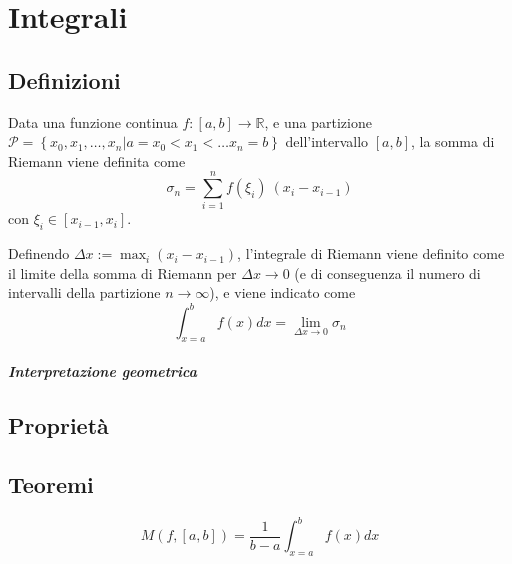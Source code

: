 \chapter{Integrali}

\section{Definizioni}
\begin{definition} Data una funzione continua $f:[a,b] \rightarrow \mathbb{R}$, e una partizione $\mathcal{P} = \left\{x_0, x_1, \dots, x_n | a = x_0 < x_1 < \dots x_n = b \right\}$ dell'intervallo $[a,b]$, la somma di Riemann viene definita come
    \begin{equation}
        \sigma_n = \sum_{i=1}^{n} f(\xi_i) \ (x_{i} - x_{i-1})
    \end{equation}
con $\xi_i \in [x_{i-1}, x_i]$.
\end{definition}

\begin{definition} Definendo $\Delta x := \max_i(x_i - x_{i-1}) $, l'integrale di Riemann viene definito come il limite della somma di Riemann per $\Delta x  \rightarrow 0$ (e di conseguenza il numero di intervalli della partizione $n \rightarrow \infty$), e viene indicato come
    \begin{equation}
        \int_{x=a}^b f(x) dx = \lim_{\Delta x \rightarrow 0} \sigma_n
    \end{equation}
\end{definition}

\begin{definition}
\end{definition}

\paragraph{Interpretazione geometrica}

\begin{definition}
\end{definition}

\section{Proprietà}

\section{Teoremi}
\begin{definition}[Media]
    \begin{equation}
        M(f, [a,b]) = \dfrac{1}{b-a} \int_{x=a}^{b} f(x) dx
    \end{equation}
\end{definition}

